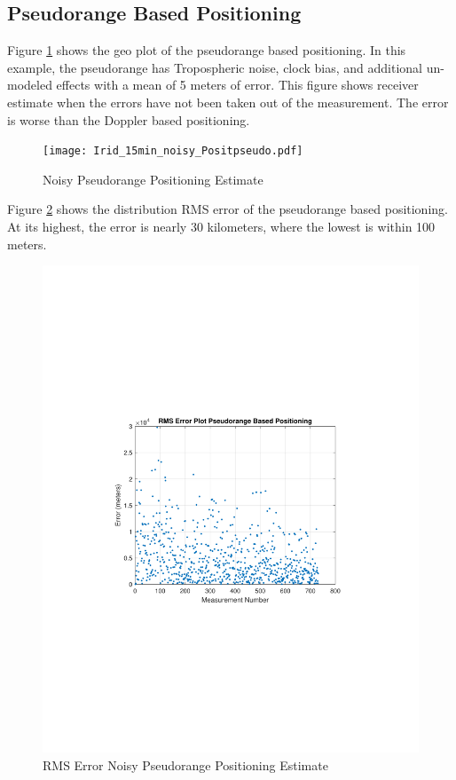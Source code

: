 \documentclass[12pt]{report}
\begin{document}
\subsection{Pseudorange Based Positioning}
Figure \ref{fig:DirtyPseudorange15minIridPosit} shows the geo plot of the pseudorange based positioning. In this example, the pseudorange has Tropospheric noise, clock bias, and additional un-modeled effects with a mean of 5 meters of error. This figure shows receiver estimate when the errors have not been taken out of the measurement. The error is worse than the Doppler based positioning. 
\begin{figure}[h!]
    \centering
    \texttt{[image: Irid\_15min\_noisy\_Positpseudo.pdf]}
    \caption{Noisy Pseudorange Positioning Estimate}
    \label{fig:DirtyPseudorange15minIridPosit}
\end{figure}
Figure \ref{fig:DirtyPseudorange15minIridPositrmse} shows the distribution RMS error of the pseudorange based positioning. At its highest, the error is nearly 30 kilometers, where the lowest is within 100 meters. 
\begin{figure}[h!]
    \centering
    \includegraphics[trim=1.2in 3.3in 1.75in 3.3in,clip,width=5in]
    {Irid_15min_noisy_RMSEpseudo.pdf}
    \caption{RMS Error Noisy Pseudorange Positioning Estimate}
    \label{fig:DirtyPseudorange15minIridPositrmse}
\end{figure}
\end{document}
